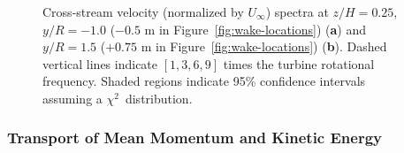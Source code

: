 \begin{figure}[ht]
\centering


\caption{Cross-stream velocity (normalized by $U_\infty$) spectra at
    $z/H=0.25$, $y/R=-1.0$ ($-0.5$ m in Figure~\ref{fig:wake-locations})
    (\textbf{a}) and $y/R=1.5$ ($+0.75$ m in Figure~\ref{fig:wake-locations})
    (\textbf{b}). Dashed vertical lines indicate $[1, 3, 6, 9]$ times the
    turbine rotational frequency. Shaded regions indicate 95\% confidence
    intervals assuming a $\chi^2$~distribution.}

\label{fig:wake-spectra}
\end{figure}


\subsubsection{Transport of Mean Momentum and Kinetic Energy}

